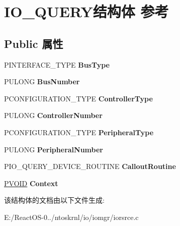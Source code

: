 \hypertarget{struct_i_o___q_u_e_r_y}{}\section{I\+O\+\_\+\+Q\+U\+E\+R\+Y结构体 参考}
\label{struct_i_o___q_u_e_r_y}
\subsection*{Public 属性}
\begin{DoxyCompactItemize}
\item 
\mbox{\label{struct_i_o___q_u_e_r_y_a0eb5a32ed1efec6981d9ef0fb8c9a8cd}} 
P\+I\+N\+T\+E\+R\+F\+A\+C\+E\+\_\+\+T\+Y\+PE {\bfseries Bus\+Type}
\item 
\mbox{\label{struct_i_o___q_u_e_r_y_aff89b7deae92bbdc22d3bb26aff5d9f8}} 
P\+U\+L\+O\+NG {\bfseries Bus\+Number}
\item 
\mbox{\label{struct_i_o___q_u_e_r_y_afcdafd5f529f5f1a591803aedb1211a6}} 
P\+C\+O\+N\+F\+I\+G\+U\+R\+A\+T\+I\+O\+N\+\_\+\+T\+Y\+PE {\bfseries Controller\+Type}
\item 
\mbox{\label{struct_i_o___q_u_e_r_y_ae1fffc46c997dfdb006e48b4d764a3e8}} 
P\+U\+L\+O\+NG {\bfseries Controller\+Number}
\item 
\mbox{\label{struct_i_o___q_u_e_r_y_adc2fe95b2ff4c88a954137e64dc48964}} 
P\+C\+O\+N\+F\+I\+G\+U\+R\+A\+T\+I\+O\+N\+\_\+\+T\+Y\+PE {\bfseries Peripheral\+Type}
\item 
\mbox{\label{struct_i_o___q_u_e_r_y_a6880ab49848237ff4573f1a4a3f4f8c0}} 
P\+U\+L\+O\+NG {\bfseries Peripheral\+Number}
\item 
\mbox{\label{struct_i_o___q_u_e_r_y_a990c9905d54e8c27d1e90e0f1434874c}} 
P\+I\+O\+\_\+\+Q\+U\+E\+R\+Y\+\_\+\+D\+E\+V\+I\+C\+E\+\_\+\+R\+O\+U\+T\+I\+NE {\bfseries Callout\+Routine}
\item 
\mbox{\label{struct_i_o___q_u_e_r_y_a5c1b9ea074123992ca7d1bf62cffbff8}} 
\hyperlink{interfacevoid}{P\+V\+O\+ID} {\bfseries Context}
\end{DoxyCompactItemize}


该结构体的文档由以下文件生成\+:\begin{DoxyCompactItemize}
\item 
E\+:/\+React\+O\+S-\/0../ntoskrnl/io/iomgr/iorsrce.\+c\end{DoxyCompactItemize}
